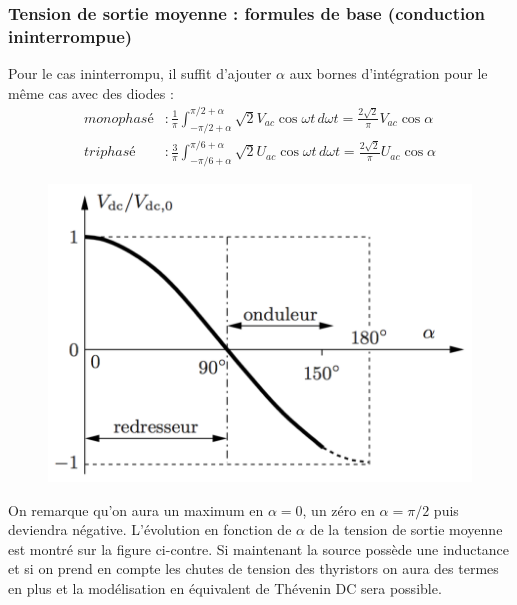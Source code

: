 				\subsubsection{Tension de sortie moyenne : formules de base (conduction ininterrompue)}
					Pour le cas ininterrompu, il suffit d'ajouter $\alpha$ aux bornes d'intégration pour le même cas avec des diodes :				
					\begin{equation}
					\begin{aligned}
					monophasé &: \frac{1}{\pi} \int _{-\pi /2+\alpha}^{\pi /2 +\alpha} \sqrt{2}V_{ac}\cos\omega t\, d\omega t = \frac{2\sqrt{2}	}{\pi} V_{ac}\cos \alpha \\
					triphasé &: \frac{3}{\pi} \int _{-\pi /6+\alpha}^{\pi /6 +\alpha} \sqrt{2}U_{ac}\cos\omega t\, d\omega t = \frac{2\sqrt{2}	}{\pi} U_{ac}\cos \alpha
					\end{aligned}
					\end{equation}
		
					\begin{figure}
					\vspace{-5mm}
					\includegraphics[scale=0.3]{ch3/8}
					\end{figure}
					On remarque qu'on aura un maximum en $\alpha = 0$, un zéro en $\alpha = \pi /2$ puis deviendra négative. L'évolution en fonction de $\alpha$ de la tension de sortie moyenne est montré sur la figure ci-contre. Si maintenant la source possède une inductance et si on prend en compte les chutes de tension des thyristors on aura des termes en plus et la modélisation en équivalent de Thévenin DC sera possible. 
					
